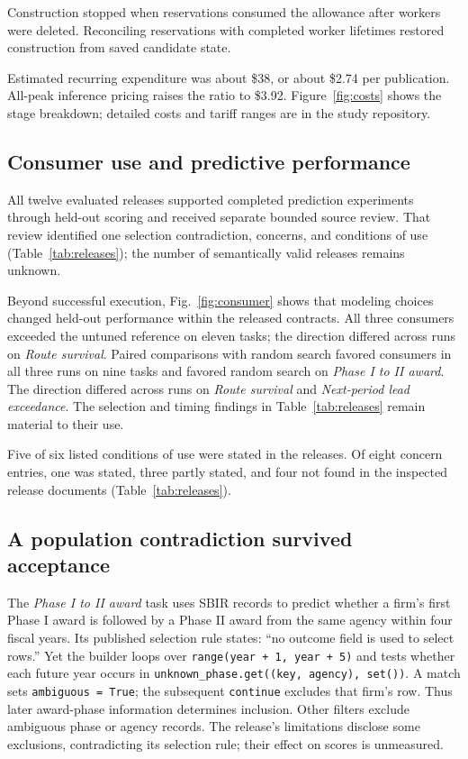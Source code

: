 \documentclass[conference,10pt,letterpaper]{IEEEtran}
\begin{document}
Construction stopped when reservations consumed the allowance after workers were deleted. Reconciling reservations with completed worker lifetimes restored construction from saved candidate state.

Estimated recurring expenditure was about \$38, or about \$2.74 per publication. All-peak inference pricing raises the ratio to \$3.92. Figure~\ref{fig:costs} shows the stage breakdown; detailed costs and tariff ranges are in the study repository.

\subsection{Consumer use and predictive performance}
All twelve evaluated releases supported completed prediction experiments through held-out scoring and received separate bounded source review. That review identified one selection contradiction, concerns, and conditions of use (Table~\ref{tab:releases}); the number of semantically valid releases remains unknown.

Beyond successful execution, Fig.~\ref{fig:consumer} shows that modeling choices changed held-out performance within the released contracts. All three consumers exceeded the untuned reference on eleven tasks; the direction differed across runs on \emph{Route survival}. Paired comparisons with random search favored consumers in all three runs on nine tasks and favored random search on \emph{Phase I to II award}. The direction differed across runs on \emph{Route survival} and \emph{Next-period lead exceedance}. The selection and timing findings in Table~\ref{tab:releases} remain material to their use.

Five of six listed conditions of use were stated in the releases. Of eight concern entries, one was stated, three partly stated, and four not found in the inspected release documents (Table~\ref{tab:releases}).

\subsection{A population contradiction survived acceptance}\label{sec:validity}
The \emph{Phase I to II award} task uses SBIR records to predict whether a firm's first Phase I award is followed by a Phase II award from the same agency within four fiscal years. Its published selection rule states: ``no outcome field is used to select rows.'' Yet the builder loops over \texttt{range(year + 1, year + 5)} and tests whether each future year occurs in \texttt{unknown\_phase.get((key, agency), set())}. A match sets \texttt{ambiguous = True}; the subsequent \texttt{continue} excludes that firm's row. Thus later award-phase information determines inclusion. Other filters exclude ambiguous phase or agency records. The release's limitations disclose some exclusions, contradicting its selection rule; their effect on scores is unmeasured.
\end{document}
